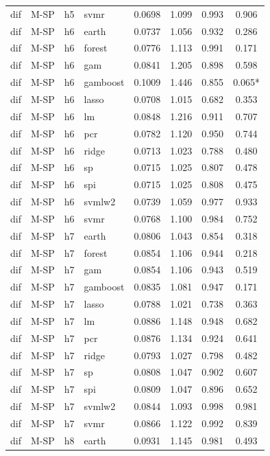 \begin{ThreePartTable}
\begin{longtable}[t]{llclcccc}
dif & M-SP & h5 & svmr & 0.0698 & 1.099 & 0.993 & 0.906\\
\addlinespace
dif & M-SP & h6 & earth & 0.0737 & 1.056 & 0.932 & 0.286\\
dif & M-SP & h6 & forest & 0.0776 & 1.113 & 0.991 & 0.171\\
dif & M-SP & h6 & gam & 0.0841 & 1.205 & 0.898 & 0.598\\
dif & M-SP & h6 & gamboost & 0.1009 & 1.446 & 0.855 & 0.065*\\
dif & M-SP & h6 & lasso & 0.0708 & 1.015 & 0.682 & 0.353\\
dif & M-SP & h6 & lm & 0.0848 & 1.216 & 0.911 & 0.707\\
dif & M-SP & h6 & pcr & 0.0782 & 1.120 & 0.950 & 0.744\\
dif & M-SP & h6 & ridge & 0.0713 & 1.023 & 0.788 & 0.480\\
dif & M-SP & h6 & sp & 0.0715 & 1.025 & 0.807 & 0.478\\
dif & M-SP & h6 & spi & 0.0715 & 1.025 & 0.808 & 0.475\\
dif & M-SP & h6 & svmlw2 & 0.0739 & 1.059 & 0.977 & 0.933\\
dif & M-SP & h6 & svmr & 0.0768 & 1.100 & 0.984 & 0.752\\
\addlinespace
dif & M-SP & h7 & earth & 0.0806 & 1.043 & 0.854 & 0.318\\
dif & M-SP & h7 & forest & 0.0854 & 1.106 & 0.944 & 0.218\\
dif & M-SP & h7 & gam & 0.0854 & 1.106 & 0.943 & 0.519\\
dif & M-SP & h7 & gamboost & 0.0835 & 1.081 & 0.947 & 0.171\\
dif & M-SP & h7 & lasso & 0.0788 & 1.021 & 0.738 & 0.363\\
dif & M-SP & h7 & lm & 0.0886 & 1.148 & 0.948 & 0.682\\
dif & M-SP & h7 & pcr & 0.0876 & 1.134 & 0.924 & 0.641\\
dif & M-SP & h7 & ridge & 0.0793 & 1.027 & 0.798 & 0.482\\
dif & M-SP & h7 & sp & 0.0808 & 1.047 & 0.902 & 0.607\\
dif & M-SP & h7 & spi & 0.0809 & 1.047 & 0.896 & 0.652\\
dif & M-SP & h7 & svmlw2 & 0.0844 & 1.093 & 0.998 & 0.981\\
dif & M-SP & h7 & svmr & 0.0866 & 1.122 & 0.992 & 0.839\\
\addlinespace
dif & M-SP & h8 & earth & 0.0931 & 1.145 & 0.981 & 0.493\\

\end{longtable}
\end{ThreePartTable}
